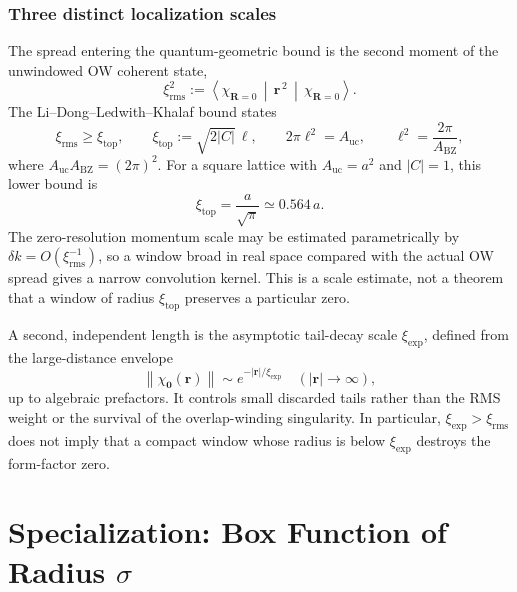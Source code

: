 \documentclass[aps,prb,onecolumn,nofootinbib,superscriptaddress]{revtex4-2}
\newcommand{\mbf}[1]{\mathbf{#1}}
\newcommand{\ev}[2]{\left\langle#2\,\middle|\,#1\,\middle|\,#2\right\rangle}
\newcommand{\norm}[1]{\left\lVert#1\right\rVert}
\begin{document}
\subsubsection{Three distinct localization scales}

The spread entering the quantum-geometric bound is the second moment of the unwindowed OW coherent state,
\begin{equation}\label{eq:xirms_def}
\xi_{\mathrm{rms}}^2 := \ev{\mbf{r}^{\,2}}{\chi_{\mbf{R}=0}} .
\end{equation}
The Li--Dong--Ledwith--Khalaf bound states
\begin{equation}\label{eq:top_spread_bound}
\xi_{\mathrm{rms}} \geq \xi_{\mathrm{top}},
\qquad
\xi_{\mathrm{top}}:=\sqrt{2|C|}\,\ell,
\qquad
2\pi\ell^2=A_{\mathrm{uc}},
\qquad
\ell^2=\frac{2\pi}{A_{\mathrm{BZ}}},
\end{equation}
where $A_{\mathrm{uc}}A_{\mathrm{BZ}}=(2\pi)^2$.  For a square lattice with $A_{\mathrm{uc}}=a^2$ and $|C|=1$, this lower bound is
\begin{equation}
\xi_{\mathrm{top}}=\frac{a}{\sqrt{\pi}}\simeq0.564\,a .
\end{equation}
The zero-resolution momentum scale may be estimated parametrically by $\delta k=O(\xi_{\mathrm{rms}}^{-1})$, so a window broad in real space compared with the actual OW spread gives a narrow convolution kernel.  This is a scale estimate, not a theorem that a window of radius $\xi_{\mathrm{top}}$ preserves a particular zero.

A second, independent length is the asymptotic tail-decay scale $\xi_{\mathrm{exp}}$, defined from the large-distance envelope
\begin{equation}
\norm{\chi_{\mbf{0}}(\mbf{r})}\sim e^{-|\mbf{r}|/\xi_{\mathrm{exp}}}
\quad (|\mbf{r}|\to\infty),
\end{equation}
up to algebraic prefactors.  It controls small discarded tails rather than the RMS weight or the survival of the overlap-winding singularity.  In particular, $\xi_{\mathrm{exp}}>\xi_{\mathrm{rms}}$ does not imply that a compact window whose radius is below $\xi_{\mathrm{exp}}$ destroys the form-factor zero.

\section{Specialization: Box Function of Radius \texorpdfstring{$\sigma$}{sigma}}
\label{sec:box}
\end{document}
